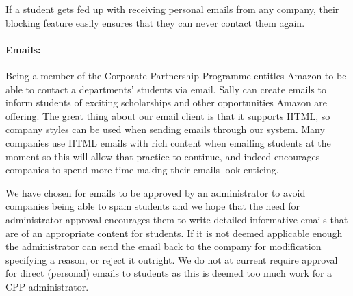     If a student gets fed up with receiving personal emails from any company, their blocking feature easily ensures that they can never contact them again.

  \paragraph{Emails:}
    Being a member of the Corporate Partnership Programme entitles Amazon to be able to contact a departments' students via email. Sally can create emails to inform students of exciting scholarships and other opportunities Amazon are offering. The great thing about our email client is that it supports HTML, so company styles can be used when sending emails through our system. Many companies use HTML emails with rich content when emailing students at the moment so this will allow that practice to continue, and indeed encourages companies to spend more time making their emails look enticing.

    We have chosen for emails to be approved by an administrator to avoid companies being able to spam students and we hope that the need for administrator approval encourages them to write detailed informative emails that are of an appropriate content for students. If it is not deemed applicable enough the administrator can send the email back to the company for modification specifying a reason, or reject it outright.
    We do not at current require approval for direct (personal) emails to students as this is deemed too much work for a CPP administrator.


